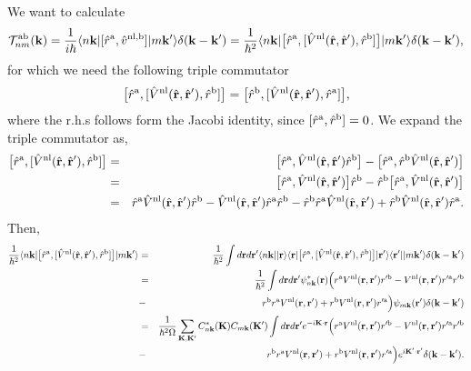 We want to calculate
\begin{eqnarray}\label{3.1}
\calt^{\rma\rmb}_{nm}(\bfk)=\frac{1}{i\hbar}
\bra{n\bfk}
[\hat r^{\rma},\hat v^{\nl,\rmb}]
\ket{m\bfk'}\gd(\bfk-\bfk')
=
\frac{1}{\hbar^2}
\bra{n\bfk}
\big[\hat r^{\rma},[\hat V^\nl(\hat\bfr,\hat\bfr'),\hat r^\rmb]\big]
\ket{m\bfk'}\gd(\bfk-\bfk')
,
\end{eqnarray} 
for which we need the following triple commutator
\begin{eqnarray}\label{3.2}
\big[\hat r^{\rma},[\hat V^\nl(\hat\bfr,\hat\bfr'),\hat r^\rmb]\big]
=
\big[\hat r^{\rmb},[\hat V^\nl(\hat\bfr,\hat\bfr'),\hat r^\rma]\big]
,
\end{eqnarray} 
where the r.h.s follows form the Jacobi identity, since $[\hat
r^\rma,\hat r^\rmb]=0$.
 We expand  the triple commutator as,
\begin{eqnarray}\label{3.3}
\big[\hat r^{\rma},[\hat V^\nl(\hat\bfr,\hat\bfr'),\hat r^\rmb]\big]
&=&
\big[\hat r^{\rma},
\hat V^\nl(\hat\bfr,\hat\bfr')\hat r^\rmb
\big]
-
\big[\hat r^{\rma},
\hat r^\rmb\hat V^\nl(\hat\bfr,\hat\bfr')
\big]
\nonumber\\
&=&
\big[\hat r^{\rma},
\hat V^\nl(\hat\bfr,\hat\bfr')
\big]\hat r^\rmb
-
\hat r^\rmb
\big[\hat r^{\rma},
\hat V^\nl(\hat\bfr,\hat\bfr')
\big]
\nonumber\\
&=&
\hat r^{\rma}
\hat V^\nl(\hat\bfr,\hat\bfr')
\hat r^\rmb
-
\hat V^\nl(\hat\bfr,\hat\bfr')
\hat r^\rma
\hat r^{\rmb}
-
\hat r^\rmb
\hat r^{\rma}
\hat V^\nl(\hat\bfr,\hat\bfr')
+
\hat r^\rmb
\hat V^\nl(\hat\bfr,\hat\bfr')
\hat r^{\rma}
.
\end{eqnarray}
Then,
\begin{eqnarray}\label{3.5}
\frac{1}{\hbar^2}
\bra{n\bfk}
\big[\hat r^{\rma},[\hat V^\nl(\hat\bfr,\hat\bfr'),\hat r^\rmb]\big]
\ket{m\bfk'}
&=&
\frac{1}{\hbar^2}
\int d\bfr d\bfr'
\bra{n\bfk}
\ket{\bfr}\bra{\bfr}
\big[\hat r^{\rma},[\hat V^\nl(\hat\bfr,\hat\bfr'),\hat r^\rmb]\big]
\ket{\bfr'}\bra{\bfr'}
\ket{m\bfk'}\gd(\bfk-\bfk')
\nonumber\\
&=&
\frac{1}{\hbar^2}
\int d\bfr d\bfr'
\psi^*_{n\bfk}(\bfr)
\Big(
r^{\rma}
V^\nl(\bfr,\bfr')
r'^\rmb
-
V^\nl(\bfr,\bfr')
r'^\rma
r'^{\rmb}
\nonumber\\
&-&
r^\rmb
r^{\rma}
V^\nl(\bfr,\bfr')
+
 r^\rmb
V^\nl(\bfr,\bfr')
r'^{\rma}
\Big) 
\psi_{m\bfk}(\bfr')
\gd(\bfk-\bfk')
\nonumber\\
&=&
\frac{1}{\hbar^2\gO}
\sum_{\bfK,\bfK'} 
C^*_{n\bfk}(\bfK) 
C_{m\bfk}(\bfK')
\int
d\bfr d\bfr'
 e^{-i\bfK\cdot\bfr}
\Big(
r^{\rma}
V^\nl(\bfr,\bfr')
r'^\rmb
-
V^\nl(\bfr,\bfr')
r'^\rma
r'^{\rmb}
\nonumber\\
&-&
r^\rmb
r^{\rma}
V^\nl(\bfr,\bfr')
+
 r^\rmb
V^\nl(\bfr,\bfr')
r'^{\rma}
\Big) 
 e^{i\bfK'\cdot\bfr'}
\gd(\bfk-\bfk')
.
\end{eqnarray} 

